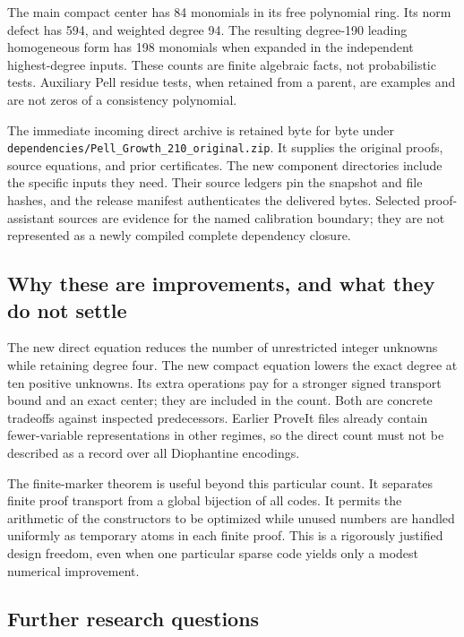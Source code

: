 \documentclass[11pt,letterpaper]{article}
\theoremstyle{remark}\newtheorem{remark}[theorem]{Remark}
\newcommand{\code}[1]{\nolinkurl{#1}}
\begin{document}
The main compact center has 84 monomials in its free polynomial ring.
Its norm defect has 594, and weighted degree 94. The resulting
degree-190 leading homogeneous form has 198 monomials when expanded
in the independent highest-degree inputs. These counts are finite
algebraic facts, not probabilistic tests. Auxiliary Pell residue tests,
when retained from a parent, are examples and are not zeros of a
consistency polynomial.

The immediate incoming direct archive is retained byte for byte under
\code{dependencies/Pell_Growth_210_original.zip}. It supplies the original
proofs, source equations, and prior certificates. The new component
directories include the specific inputs they need. Their source ledgers
pin the snapshot and file hashes, and the release manifest authenticates
the delivered bytes. Selected proof-assistant sources are evidence for
the named calibration boundary; they are not represented as a newly
compiled complete dependency closure.

\subsection{Why these are improvements, and what they do not settle}

The new direct equation reduces the number of unrestricted integer
unknowns while retaining degree four. The new compact equation lowers
the exact degree at ten positive unknowns. Its extra operations pay
for a stronger signed transport bound and an exact center; they are
included in the count. Both are concrete tradeoffs against inspected
predecessors. Earlier ProveIt files already contain fewer-variable
representations in other regimes, so the direct count must not be
described as a record over all Diophantine encodings.

The finite-marker theorem is useful beyond this particular count. It
separates finite proof transport from a global bijection of all codes.
It permits the arithmetic of the constructors to be optimized while
unused numbers are handled uniformly as temporary atoms in each finite
proof. This is a rigorously justified design freedom, even when one
particular sparse code yields only a modest numerical improvement.

\subsection{Further research questions}
\end{document}
